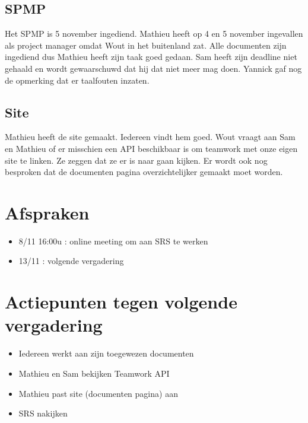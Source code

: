 \subsection{SPMP}
Het SPMP is 5 november ingediend. Mathieu heeft op 4 en 5 november ingevallen als project manager omdat Wout in het buitenland zat. Alle documenten zijn ingediend dus Mathieu heeft zijn taak goed gedaan. Sam heeft zijn deadline niet gehaald en wordt gewaarschuwd dat hij dat niet meer mag doen. Yannick gaf nog de opmerking dat er taalfouten inzaten.

\subsection{Site}
Mathieu heeft de site gemaakt. Iedereen vindt hem goed. Wout vraagt aan Sam en Mathieu of er misschien een API beschikbaar is om teamwork met onze eigen site te linken. Ze zeggen dat ze er is naar gaan kijken. Er wordt ook nog besproken dat de documenten pagina overzichtelijker gemaakt moet worden. 

\section{Afspraken}
\begin{itemize}
\item 8/11 16:00u : online meeting om aan SRS te werken
\item 13/11 : volgende vergadering
\end{itemize}

\section{Actiepunten tegen volgende vergadering}
\begin{itemize}
\item Iedereen werkt aan zijn toegewezen documenten 
\item Mathieu en Sam bekijken Teamwork API
\item Mathieu past site (documenten pagina) aan
\item SRS nakijken
\end{itemize}

